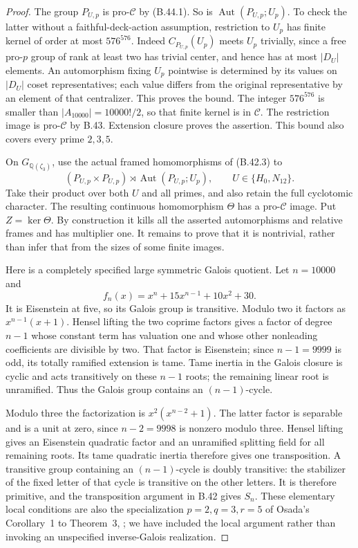 \begin{proof}
The group $P_{U,p}$ is pro-$\mathscr C$
by (B.44.1).  So is
$\operatorname{Aut}(P_{U,p};U_p)$.
To check the latter without a
faithful-deck-action assumption,
restriction to $U_p$ has finite
kernel of order at most $576^{576}$.
Indeed $C_{P_{U,p}}(U_p)$ meets
$U_p$ trivially, since a free
pro-$p$ group of rank at least
two has trivial center, and hence
has at most $|D_U|$ elements.
An automorphism fixing $U_p$
pointwise is determined by its
values on $|D_U|$ coset representatives;
each value differs from the
original representative by an
element of that centralizer.
This proves the bound.  The
integer $576^{576}$ is smaller
than $|A_{10000}|=10000!/2$,
so that finite kernel is in
$\mathscr C$.  The restriction
image is pro-$\mathscr C$ by
B.43.  Extension closure proves
the assertion.  This bound also
covers every prime $2,3,5$.

On $G_{\mathbb Q(\zeta_3)}$, use
the actual framed homomorphisms
of (B.42.3) to
\[
 (P_{U,p}\times P_{U,p})
   \rtimes\operatorname{Aut}(P_{U,p};U_p),
             \qquad U\in\{H_0,N_{12}\}.
\]
Take their product over both $U$
and all primes, and also retain
the full cyclotomic character.
The resulting continuous
homomorphism $\Theta$ has a
pro-$\mathscr C$ image.  Put
$Z=\ker\Theta$.  By construction
it kills all the asserted
automorphisms and relative frames
and has multiplier one.  It
remains to prove that it is
nontrivial, rather than infer
that from the sizes of some
finite images.

Here is a completely specified
large symmetric Galois quotient.
Let $n=10000$ and
\[
                    f_n(x)=x^n+15x^{n-1}+10x^2+30.          \tag{B.44.2}
\]
It is Eisenstein at five, so
its Galois group is transitive.
Modulo two it factors as
$x^{n-1}(x+1)$.  Hensel lifting
the two coprime factors gives
a factor of degree $n-1$ whose
constant term has valuation one
and whose other nonleading
coefficients are divisible by
two.  That factor is Eisenstein;
since $n-1=9999$ is odd, its
totally ramified extension is
tame.  Tame inertia in the
Galois closure is cyclic and
acts transitively on these
$n-1$ roots; the remaining
linear root is unramified.
Thus the Galois group contains
an $(n-1)$-cycle.

Modulo three the factorization
is $x^2(x^{n-2}+1)$.  The latter
factor is separable and is a
unit at zero, since $n-2=9998$
is nonzero modulo three.
Hensel lifting gives an
Eisenstein quadratic factor
and an unramified splitting
field for all remaining roots.
Its tame quadratic inertia
therefore gives one transposition.
A transitive group containing
an $(n-1)$-cycle is doubly
transitive: the stabilizer of
the fixed letter of that cycle
is transitive on the other
letters.  It is therefore
primitive, and the transposition
argument in B.42 gives $S_n$.
These elementary local conditions
are also the specialization
$p=2,q=3,r=5$ of Osada's
Corollary~1 to Theorem~3,
\cite{CEOsada1987II}; we have
included the local argument
rather than invoking an
unspecified inverse-Galois
realization.


\end{proof}
